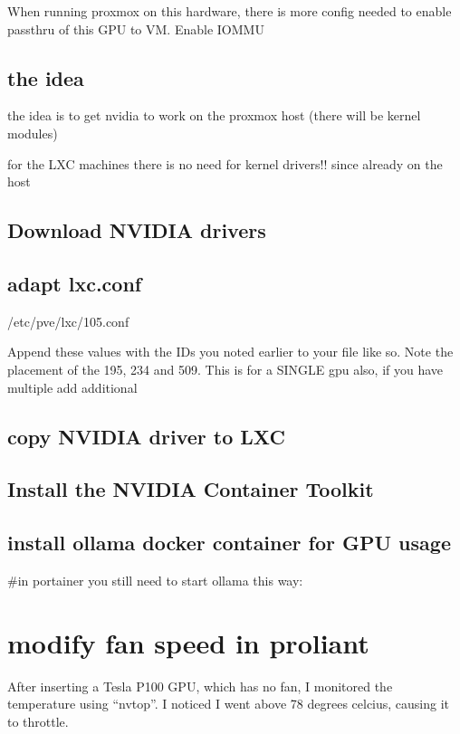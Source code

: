 \documentclass[letterpaper,10pt,english]{sphinxmanual}
\begin{document}
\sphinxAtStartPar
When running proxmox on this hardware, there is more config needed to enable passthru of this GPU to VM.
Enable IOMMU


\section{the idea}
\label{\detokenize{NVIDIA:the-idea}}
\sphinxAtStartPar
the idea is to get nvidia to work on the proxmox host (there will be kernel modules)

\sphinxAtStartPar
for the LXC machines there is no need for kernel drivers!! since already on the host


\section{Download NVIDIA drivers}
\label{\detokenize{NVIDIA:download-nvidia-drivers}}

\section{adapt lxc.conf}
\label{\detokenize{NVIDIA:adapt-lxc-conf}}
\sphinxAtStartPar
/etc/pve/lxc/105.conf

\sphinxAtStartPar
Append these values with the IDs you noted earlier to your file like so. Note the placement of the 195, 234 and 509. This is for a SINGLE gpu also, if you have multiple add additional


\section{copy NVIDIA driver to LXC}
\label{\detokenize{NVIDIA:copy-nvidia-driver-to-lxc}}

\section{Install the NVIDIA Container Toolkit}
\label{\detokenize{NVIDIA:install-the-nvidia-container-toolkit}}

\section{install ollama docker container for GPU usage}
\label{\detokenize{NVIDIA:install-ollama-docker-container-for-gpu-usage}}
\sphinxAtStartPar
\#in portainer you still need to start ollama this way:

\sphinxstepscope


\chapter{modify fan speed in proliant}
\label{\detokenize{fan:modify-fan-speed-in-proliant}}\label{\detokenize{fan::doc}}
\sphinxAtStartPar
After inserting a Tesla P100 GPU, which has no fan, I monitored the temperature using “nvtop”. I noticed I went above 78 degrees celcius, causing it to throttle.
\end{document}
